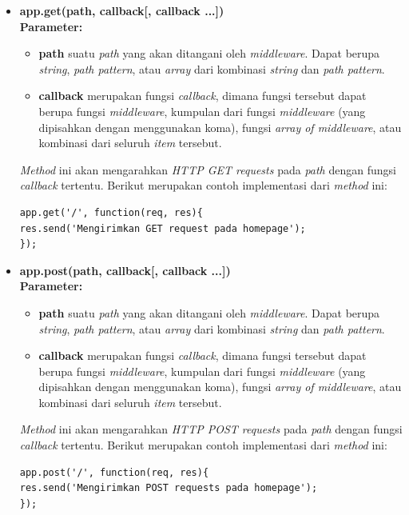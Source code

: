 \documentclass[a4paper,twoside]{article}
\begin{document}
\begin{enumerate}
\begin{enumerate}
\begin{itemize}
				\item \textbf{app.get(path, callback[, callback ...])} \\ \textbf{Parameter:}
				\begin{itemize}
					\item \textbf{path} suatu \textit{path} yang akan ditangani oleh \textit{middleware}. Dapat berupa \textit{string}, \textit{path pattern}, atau \textit{array} dari kombinasi \textit{string} dan \textit{path pattern}.
					
					\item \textbf{callback} merupakan fungsi \textit{callback}, dimana fungsi tersebut dapat berupa fungsi \textit{middleware}, kumpulan dari fungsi \textit{middleware} (yang dipisahkan dengan menggunakan koma), fungsi \textit{array of middleware}, atau kombinasi dari seluruh \textit{item} tersebut.
				\end{itemize}
				
				\textit{Method} ini akan mengarahkan \textit{HTTP GET requests} pada \textit{path} dengan fungsi \textit{callback} tertentu. Berikut merupakan contoh implementasi dari \textit{method} ini:
\begin{lstlisting}
app.get('/', function(req, res){
res.send('Mengirimkan GET request pada homepage');
});
\end{lstlisting}
				
				\item \textbf{app.post(path, callback[, callback ...])} \\ \textbf{Parameter:}
				\begin{itemize}
					\item \textbf{path} suatu \textit{path} yang akan ditangani oleh \textit{middleware}. Dapat berupa \textit{string}, \textit{path pattern}, atau \textit{array} dari kombinasi \textit{string} dan \textit{path pattern}.
					
					\item \textbf{callback} merupakan fungsi \textit{callback}, dimana fungsi tersebut dapat berupa fungsi \textit{middleware}, kumpulan dari fungsi \textit{middleware} (yang dipisahkan dengan menggunakan koma), fungsi \textit{array of middleware}, atau kombinasi dari seluruh \textit{item} tersebut.
				\end{itemize}
				
				\textit{Method} ini akan mengarahkan \textit{HTTP POST requests} pada \textit{path} dengan fungsi \textit{callback} tertentu. Berikut merupakan contoh implementasi dari \textit{method} ini:
\begin{lstlisting}
app.post('/', function(req, res){
res.send('Mengirimkan POST requests pada homepage');
});
\end{lstlisting}
				

\end{itemize}
\end{enumerate}
\end{enumerate}
\end{document}
